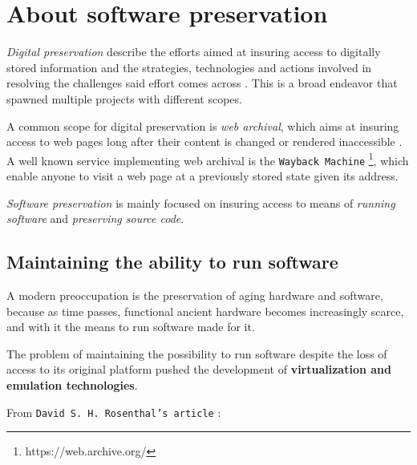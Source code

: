 \documentclass[11pt]{article}
\begin{document}
\newpage

\section{About software preservation}

\textit{Digital preservation} describe the efforts aimed at insuring access to digitally stored information and the strategies, technologies and actions involved in resolving the challenges said effort comes across \cite{digipresdef,lee2002state}. This is a broad endeavor that spawned multiple projects with different scopes.

A common scope for digital preservation is \textit{web archival}, which aims at insuring access to web pages long after their content is changed or rendered inaccessible \cite{masanes2006web}. A well known service implementing web archival is the \texttt{Wayback Machine} \footnote[1]{https://web.archive.org/}, which enable anyone to visit a web page at a previously stored state given its address.

\textit{Software preservation} is mainly focused on insuring access to means of \textit{running software} and \textit{preserving source code}.


\subsection{Maintaining the ability to run software}

A modern preoccupation is the preservation of aging hardware and software, because as time passes, functional ancient hardware becomes increasingly scarce, and with it the means to run software made for it.

The problem of maintaining the possibility to run software despite the loss of access to its original platform pushed the development of \textbf{virtualization and emulation technologies}.

From \texttt{David S. H. Rosenthal's article} \cite{rosenthal2015emulation}:

\end{document}
